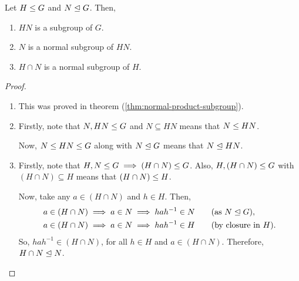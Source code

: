\documentclass[11pt]{penrose}
\begin{document}
\begin{nlemma}
    Let $H \mathrel{\leq} G$ and $N \mathrel{\trianglelefteq} G$. Then,
    \begin{enumerate}
        \item $HN$ is a subgroup of $G$.
        \item $N$ is a normal subgroup of $HN$.
        \item $H \cap N$ is a normal subgroup of $H$.
    \end{enumerate}
\end{nlemma}
\begin{proof}\phantom{}
    \begin{enumerate}
        \item This was proved in theorem (\ref{thm:normal-product-subgroup}).

        \item Firstly, note that $N, HN \mathrel{\leq} G$ and $N \subseteq HN$ means that $N \mathrel{\leq} HN$.

        Now, $N \mathrel{\leq} HN \mathrel{\leq} G$ along with $N \mathrel{\trianglelefteq} G$ means that $N \mathrel{\trianglelefteq} HN$.

        \item Firstly, note that $H, N \mathrel{\leq} G \implies (H \cap N) \mathrel{\leq} G$. Also, $H, (H \cap N) \mathrel{\leq} G$ with $(H \cap N) \subseteq H$ means that $(H \cap N) \mathrel{\leq} H$.

        Now, take any $a \in (H \cap N)$ and $h \in H$. Then,
        \begin{align*}
            a \in (H \cap N) \implies a \in N &\implies h a h^{-1} \in N \qquad\text{(as $N \mathrel{\trianglelefteq} G$)},\\
            a \in (H \cap N) \implies a \in N &\implies h a h^{-1} \in H \qquad\text{(by closure in  $H$)}.
        \end{align*}
        So, $h a h^{-1} \in (H \cap N)$, for all $h \in H$ and $a \in (H \cap N)$. Therefore, $H \cap N \mathrel{\trianglelefteq} N$.
        \qedhere
    \end{enumerate}
\end{proof}
\end{document}
